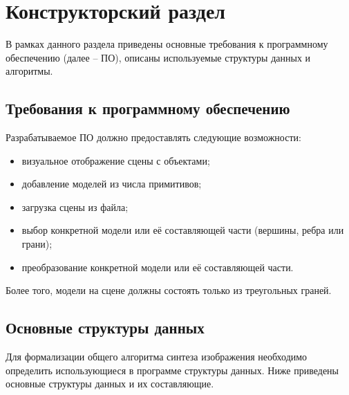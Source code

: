 \chapter{Конструкторский раздел}

В рамках данного раздела приведены основные требования к программному обеспечению (далее -- ПО), описаны используемые структуры данных и алгоритмы.

\section{Требования к программному обеспечению}

Разрабатываемое ПО должно предоставлять следующие возможности:

\begin{itemize}[label=---]
	\item визуальное отображение сцены с объектами;

	\item добавление моделей из числа примитивов;
	\item загрузка сцены из файла;
	\item выбор конкретной модели или её составляющей части (вершины, ребра или грани);
	\item преобразование конкретной модели или её составляющей части.
\end{itemize}

Более того, модели на сцене должны состоять только из треугольных граней.
	
\section{Основные структуры данных}

Для формализации общего алгоритма синтеза изображения необходимо определить использующиеся в программе структуры данных. Ниже приведены основные структуры данных и их составляющие.

